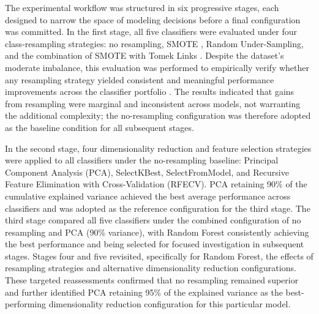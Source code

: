 The experimental workflow was structured in six progressive stages, each designed to narrow the
space of modeling decisions before a final configuration was committed. In the first stage, all
five classifiers were evaluated under four class-resampling strategies: no resampling, SMOTE
\cite{chawla2002smote}, Random Under-Sampling, and the combination of SMOTE with Tomek Links
\cite{tomek1976}. Despite the dataset's moderate imbalance, this evaluation was performed to
empirically verify whether any resampling strategy yielded consistent and meaningful performance
improvements across the classifier portfolio \cite{he2009imbalanced}. The results indicated that
gains from resampling were marginal and inconsistent across models, not warranting the additional
complexity; the no-resampling configuration was therefore adopted as the baseline condition for all
subsequent stages.

In the second stage, four dimensionality reduction and feature selection strategies were applied to
all classifiers under the no-resampling baseline: Principal Component Analysis (PCA),
SelectKBest, SelectFromModel, and Recursive Feature Elimination with Cross-Validation (RFECV).
PCA retaining 90\% of the cumulative explained variance achieved the best average performance
across classifiers and was adopted as the reference configuration for the third stage. The third
stage compared all five classifiers under the combined configuration of no resampling and PCA
(90\% variance), with Random Forest consistently achieving the best performance and being selected
for focused investigation in subsequent stages. Stages four and five revisited, specifically for
Random Forest, the effects of resampling strategies and alternative dimensionality reduction
configurations. These targeted reassessments confirmed that no resampling remained superior and further identified
PCA retaining 95\% of the explained variance as the best-performing dimensionality reduction
configuration for this particular model.

